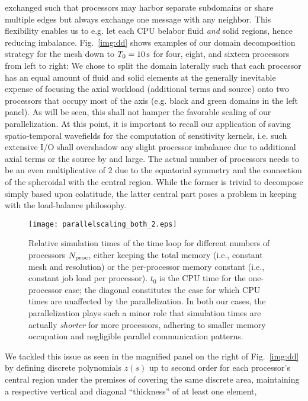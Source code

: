 exchanged such that processors may harbor separate subdomains or share
multiple edges but always exchange one message with any neighbor.
This flexibility enables us to e.g. let each CPU belabor fluid {\it and} solid regions,
hence reducing imbalance.
%
Fig.~\ref{img:dd} shows examples of our domain decomposition strategy
for the mesh down to $T_0=10\,{\rm s}$ for four, eight, and sixteen
processors from left to right:
We chose to split the domain laterally such that each processor has an
equal amount of fluid and solid elements at the generally inevitable expense of
focusing the axial workload (additional terms and source) onto two
processors that occupy most of the axis (e.g. black and green domains in the
left panel).
%
As will be seen, this shall not hamper the favorable scaling of
our parallelization. At this point, it is important to recall our application of
saving spatio-temporal wavefields for the computation of sensitivity kernels,
i.e. such extensive I/O shall overshadow any slight processor imbalance due to
additional axial terms or the source by and large.
The actual number of processors needs to be an even
multiplicative of $2$ due to the equatorial symmetry and the connection
of the spheroidal with the central region. While the former is trivial to
decompose simply based upon colatitude, the latter central part poses
a problem in keeping with the load-balance philosophy.
%
\begin{figure}[tb!]
\begin{center}
\texttt{[image: parallelscaling\_both\_2.eps]}
\caption{Relative simulation times of the time loop for different numbers of processors
$N_{\rm proc}$, either keeping the total memory (i.e., constant mesh and resolution)
or the per-processor memory constant (i.e., constant job load per processor). $t_0$
is the CPU time for the one-processor case;
the diagonal constitutes the case for which CPU times are unaffected by the parallelization.
In both our cases, the parallelization
plays such a minor role that simulation times are actually \textit{shorter} for more processors,
adhering to smaller memory occupation and negligible parallel communication patterns.}
\label{img:scaling}
\end{center}
\end{figure}
%
We tackled this issue as seen in the magnified panel on the right of
Fig.~\ref{img:dd} by defining discrete polynomials $z(s)$ up to
second order for each processor's central region under the premises of
covering the same discrete area, maintaining a respective
vertical and diagonal ``thickness'' of at least one element,
